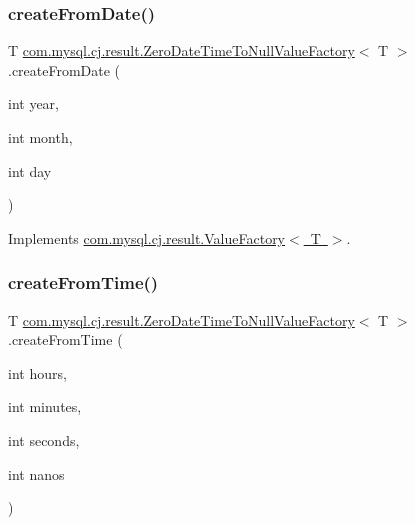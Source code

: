 \subsubsection{\texorpdfstring{create\+From\+Date()}{createFromDate()}}
{\footnotesize\ttfamily T \mbox{\hyperlink{classcom_1_1mysql_1_1cj_1_1result_1_1_zero_date_time_to_null_value_factory}{com.\+mysql.\+cj.\+result.\+Zero\+Date\+Time\+To\+Null\+Value\+Factory}}$<$ T $>$.create\+From\+Date (\begin{DoxyParamCaption}\item[{int}]{year,  }\item[{int}]{month,  }\item[{int}]{day }\end{DoxyParamCaption})}



Implements \mbox{\hyperlink{interfacecom_1_1mysql_1_1cj_1_1result_1_1_value_factory_a5c7828e8fe372c9070e0e64ddafac761}{com.\+mysql.\+cj.\+result.\+Value\+Factory$<$ T $>$}}.

\mbox{\label{classcom_1_1mysql_1_1cj_1_1result_1_1_zero_date_time_to_null_value_factory_a22e98e55a6975488e6f74fb406141a31}} 
\subsubsection{\texorpdfstring{create\+From\+Time()}{createFromTime()}}
{\footnotesize\ttfamily T \mbox{\hyperlink{classcom_1_1mysql_1_1cj_1_1result_1_1_zero_date_time_to_null_value_factory}{com.\+mysql.\+cj.\+result.\+Zero\+Date\+Time\+To\+Null\+Value\+Factory}}$<$ T $>$.create\+From\+Time (\begin{DoxyParamCaption}\item[{int}]{hours,  }\item[{int}]{minutes,  }\item[{int}]{seconds,  }\item[{int}]{nanos }\end{DoxyParamCaption})}




